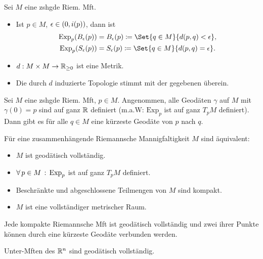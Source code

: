 \documentclass{cheat-sheet}
\newcommand{\Exp}{\mathrm{Exp}} %
\begin{document}
\begin{satz}
  Sei $M$ eine zshgde Riem. Mft.
  \begin{itemize}
    \item Ist $p \in M$, $\epsilon \in \left( 0, i(p) \right)$, dann ist
    \begin{align*}
      \Exp_p(B_\epsilon(p)) & = B_\epsilon(p) \coloneqq \Set{q \in M}{d(p, q) < \epsilon},\\
      \Exp_p(S_\epsilon(p)) & = S_\epsilon(p) \coloneqq \Set{q \in M}{d(p, q) = \epsilon}.
    \end{align*}
    \item $d : M \times M \to \mathbb{R}_{\geq 0}$ ist eine Metrik.
    \item Die durch $d$ induzierte Topologie stimmt mit der gegebenen überein.
  \end{itemize}
\end{satz}


\begin{satz}
  Sei $M$ eine zshgde Riem. Mft, $p \in M$. Angenommen, alle Geodäten $\gamma$ auf $M$ mit $\gamma(0) = p$ sind auf ganz $\mathbb{R}$ definiert (m.a.W: $\Exp_p$ ist auf ganz $T_p M$ definiert). Dann gibt es für alle $q \in M$ eine kürzeste Geodäte von $p$ nach $q$.
\end{satz}

\begin{satz}
  Für eine zusammenhängende Riemannsche Mannigfaltigkeit $M$ sind äquivalent:
  \begin{itemize}
    \item $M$ ist geodätisch vollständig.
    \item $\fa{p \in M} \Exp_p$ ist auf ganz $T_p M$ definiert.
    \item Beschränkte und abgeschlossene Teilmengen von $M$ sind kompakt.
    \item $M$ ist eine vollständiger metrischer Raum.
  \end{itemize}
\end{satz}

\begin{kor}
  Jede kompakte Riemannsche Mft ist geodätisch vollständig und zwei ihrer Punkte können durch eine kürzeste Geodäte verbunden werden.
\end{kor}

\begin{kor}
  Unter-Mften des $\mathbb{R}^n$ sind geodätisch vollständig.
\end{kor}
\end{document}
